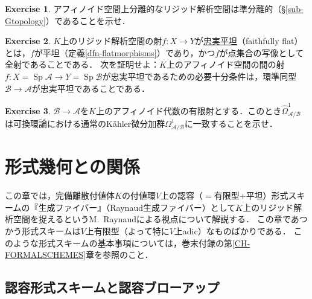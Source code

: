 \documentclass[a4paper,12pt, dvipdfmx]{jsbook}
\def\Sp{\mathop{\mathrm{Sp}}\nolimits}
\theoremstyle{plain}
\theoremstyle{definition}
\newtheorem{exer}{\bfseries Exercise}[chapter]
\newcounter{chushaku}
\begin{document}
\begin{exer}\label{exer-separatedquasiseparated}{\rm 
アフィノイド空間上分離的なリジッド解析空間は準分離的（\S\ref{sub-Gtopology}）であることを示せ．}
\end{exer}

\begin{exer}\label{exer-faithfullyflatmorphisms}{\rm 
$K$上のリジッド解析空間の射$f\colon X\rightarrow Y$が\underline{忠実平坦}（faithfully flat）とは，$f$が平坦（定義\ref{dfn-flatmorphisms}）であり，かつ$f$が点集合の写像として全射であることである．
次を証明せよ：$K$上のアフィノイド空間の間の射$f\colon X=\Sp\mathcal{A}\rightarrow Y=\Sp\mathcal{B}$が忠実平坦であるための必要十分条件は，環準同型$\mathcal{B}\rightarrow\mathcal{A}$が忠実平坦であることである．}
\end{exer}

\begin{exer}\label{exer-finitedifferential}{\rm 
$\mathcal{B}\rightarrow\mathcal{A}$を$K$上のアフィノイド代数の有限射とする．このとき$\widehat{\Omega}^1_{\mathcal{A}/\mathcal{B}}$は可換環論における通常のK\"ahler微分加群$\Omega^1_{\mathcal{A}/\mathcal{B}}$に一致することを示せ．}
\end{exer}





\setcounter{chushaku}{0}
\chapter{形式幾何との関係}\label{CH-RAYNAUD}
この章では，完備離散付値体$K$の付値環$V$上の認容（$=$有限型$+$平坦）形式スキームの『生成ファイバー』（Raynaud生成ファイバー）として$K$上のリジッド解析空間を捉えるというM.\ Raynaudによる視点について解説する．
この章であつかう形式スキームは$V$上有限型（よって特に$V$上adic）なものばかりである．
このような形式スキームの基本事項については，巻末付録の第\ref{CH-FORMALSCHEMES}章を参照のこと．

\section{認容形式スキームと認容ブローアップ}\label{sec-admissibleformalschemes}
\end{document}
